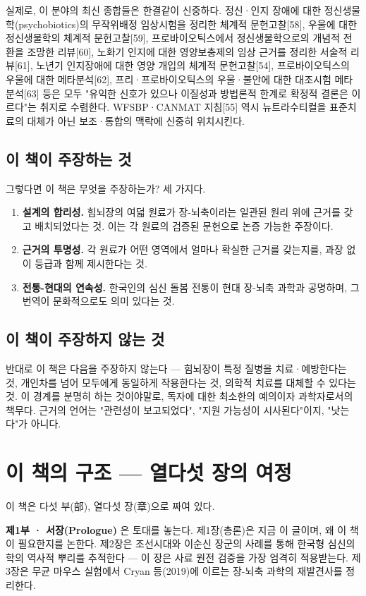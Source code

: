 \documentclass[11pt,oneside]{book}
\begin{document}
실제로, 이 분야의 최신 종합들은 한결같이 신중하다. 정신·인지 장애에 대한 정신생물학(psychobiotics)의 무작위배정 임상시험을 정리한 체계적 문헌고찰[58], 우울에 대한 정신생물학의 체계적 문헌고찰[59], 프로바이오틱스에서 정신생물학으로의 개념적 전환을 조망한 리뷰[60], 노화기 인지에 대한 영양보충제의 임상 근거를 정리한 서술적 리뷰[61], 노년기 인지장애에 대한 영양 개입의 체계적 문헌고찰[54], 프로바이오틱스의 우울에 대한 메타분석[62], 프리·프로바이오틱스의 우울·불안에 대한 대조시험 메타분석[63] 등은 모두 "유익한 신호가 있으나 이질성과 방법론적 한계로 확정적 결론은 이르다"는 취지로 수렴한다. WFSBP·CANMAT 지침[55] 역시 뉴트라수티컬을 표준치료의 대체가 아닌 보조·통합의 맥락에 신중히 위치시킨다.

\subsection{이 책이 주장하는 것}
그렇다면 이 책은 무엇을 주장하는가? 세 가지다.

\begin{enumerate}[leftmargin=6mm,itemsep=1pt,topsep=2pt]
  \item \textbf{설계의 합리성.} 힘뇌장의 여덟 원료가 장-뇌축이라는 일관된 원리 위에 근거를 갖고 배치되었다는 것. 이는 각 원료의 검증된 문헌으로 논증 가능한 주장이다.
  \item \textbf{근거의 투명성.} 각 원료가 어떤 영역에서 얼마나 확실한 근거를 갖는지를, 과장 없이 등급과 함께 제시한다는 것.
  \item \textbf{전통-현대의 연속성.} 한국인의 심신 돌봄 전통이 현대 장-뇌축 과학과 공명하며, 그 번역이 문화적으로도 의미 있다는 것.
\end{enumerate}
\subsection{이 책이 주장하지 않는 것}
반대로 이 책은 다음을 주장하지 않는다 — 힘뇌장이 특정 질병을 치료·예방한다는 것, 개인차를 넘어 모두에게 동일하게 작용한다는 것, 의학적 치료를 대체할 수 있다는 것. 이 경계를 분명히 하는 것이야말로, 독자에 대한 최소한의 예의이자 과학자로서의 책무다. 근거의 언어는 "관련성이 보고되었다", "지원 가능성이 시사된다"이지, "낫는다"가 아니다.

\section{이 책의 구조 — 열다섯 장의 여정}
이 책은 다섯 부(部), 열다섯 장(章)으로 짜여 있다.

\textbf{제1부 · 서장(Prologue)} 은 토대를 놓는다. 제1장(총론)은 지금 이 글이며, 왜 이 책이 필요한지를 논한다. 제2장은 조선시대와 이순신 장군의 사례를 통해 한국형 심신의학의 역사적 뿌리를 추적한다 — 이 장은 사료 원전 검증을 가장 엄격히 적용받는다. 제3장은 무균 마우스 실험에서 Cryan 등(2019)에 이르는 장-뇌축 과학의 재발견사를 정리한다.
\end{document}
